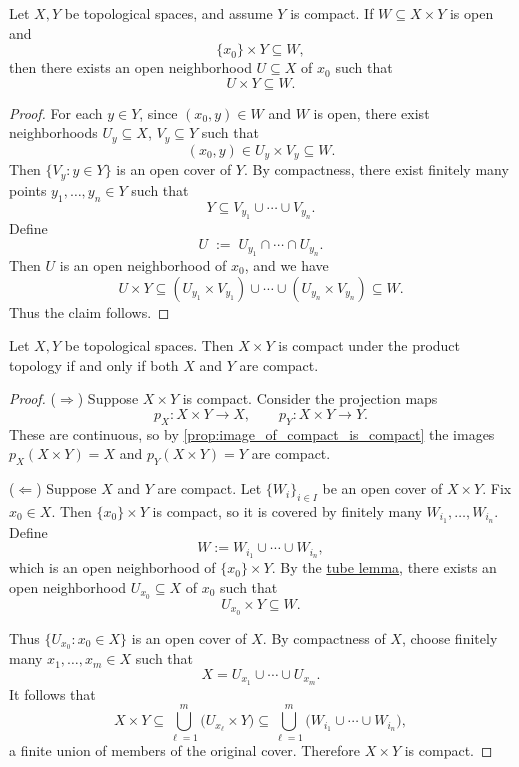 \begin{lemma}\label{lem:tube}
Let \(X, Y\) be topological spaces, and assume \(Y\) is compact.  
If \(W \subseteq X \times Y\) is open and 
\[
\{x_0\} \times Y \subseteq W,
\]
then there exists an open neighborhood \(U \subseteq X\) of \(x_0\) such that 
\[
U \times Y \subseteq W.
\]
\end{lemma}

\begin{proof}
For each \(y \in Y\), since \((x_0, y) \in W\) and \(W\) is open, there exist neighborhoods 
\(U_y \subseteq X\), \(V_y \subseteq Y\) such that
\[
(x_0, y) \in U_y \times V_y \subseteq W.
\]
Then \(\{V_y : y \in Y\}\) is an open cover of \(Y\).  
By compactness, there exist finitely many points \(y_1, \ldots, y_n \in Y\) such that
\[
Y \subseteq V_{y_1} \cup \cdots \cup V_{y_n}.
\]
Define
\[
U \;:=\; U_{y_1} \cap \cdots \cap U_{y_n}.
\]
Then \(U\) is an open neighborhood of \(x_0\), and we have
\[
U \times Y \subseteq (U_{y_1} \times V_{y_1}) \cup \cdots \cup (U_{y_n} \times V_{y_n})
\subseteq W.
\]
Thus the claim follows.
\end{proof}

\begin{theorem}\label{thm:product_compact}
Let \(X,Y\) be topological spaces. Then \(X \times Y\) is compact under the product topology 
if and only if both \(X\) and \(Y\) are compact.
\end{theorem}

\begin{proof}
\noindent(\(\Rightarrow\)) Suppose \(X \times Y\) is compact.  
Consider the projection maps
\[
p_X : X \times Y \to X, 
\qquad 
p_Y : X \times Y \to Y.
\]
These are continuous, so by \autoref{prop:image_of_compact_is_compact} the images
\(p_X(X \times Y) = X\) and \(p_Y(X \times Y) = Y\) are compact.

\smallskip
\noindent(\(\Leftarrow\)) Suppose \(X\) and \(Y\) are compact.  
Let \(\{W_i\}_{i \in I}\) be an open cover of \(X \times Y\).  
Fix \(x_0 \in X\). Then \(\{x_0\} \times Y\) is compact, so it is covered by finitely many 
\(W_{i_1}, \dots, W_{i_n}\).  
Define
\[
W := W_{i_1} \cup \cdots \cup W_{i_n},
\]
which is an open neighborhood of \(\{x_0\} \times Y\).  
By the \hyperref[lem:tube]{tube lemma}, there exists an open neighborhood \(U_{x_0} \subseteq X\) of \(x_0\) such that
\[
U_{x_0} \times Y \subseteq W.
\]

Thus \(\{U_{x_0} : x_0 \in X\}\) is an open cover of \(X\).  
By compactness of \(X\), choose finitely many \(x_1,\dots,x_m \in X\) such that
\[
X = U_{x_1} \cup \cdots \cup U_{x_m}.
\]
It follows that
\[
X \times Y \subseteq \bigcup_{\ell=1}^m \bigl(U_{x_\ell} \times Y \bigr) 
\subseteq \bigcup_{\ell=1}^m \bigl(W_{i_1} \cup \cdots \cup W_{i_n}\bigr),
\]
a finite union of members of the original cover.  
Therefore \(X \times Y\) is compact.
\end{proof}

